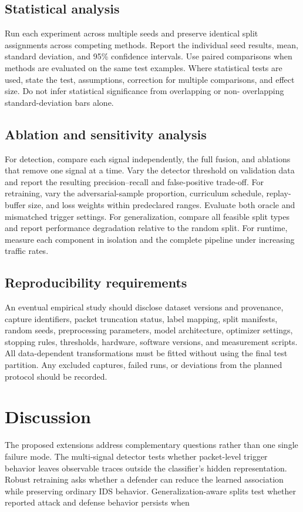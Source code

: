 \documentclass[11pt]{article}
\begin{document}
\subsection{Statistical analysis}
Run each experiment across multiple seeds and preserve identical split assignments across competing methods. Report the individual seed results, mean, standard deviation, and 95\% confidence intervals. Use paired comparisons when methods are evaluated on the same test examples. Where statistical tests are used, state the test, assumptions, correction for multiple comparisons, and effect size. Do not infer statistical significance from overlapping or non- overlapping standard-deviation bars alone.

\subsection{Ablation and sensitivity analysis}
For detection, compare each signal independently, the full fusion, and ablations that remove one signal at a time. Vary the detector threshold on validation data and report the resulting precision--recall and false-positive trade-off. For retraining, vary the adversarial-sample proportion, curriculum schedule, replay-buffer size, and loss weights within predeclared ranges. Evaluate both oracle and mismatched trigger settings. For generalization, compare all feasible split types and report performance degradation relative to the random split. For runtime, measure each component in isolation and the complete pipeline under increasing traffic rates.

\subsection{Reproducibility requirements}
An eventual empirical study should disclose dataset versions and provenance, capture identifiers, packet truncation status, label mapping, split manifests, random seeds, preprocessing parameters, model architecture, optimizer settings, stopping rules, thresholds, hardware, software versions, and measurement scripts. All data-dependent transformations must be fitted without using the final test partition. Any excluded captures, failed runs, or deviations from the planned protocol should be recorded.

\section{Discussion}
The proposed extensions address complementary questions rather than one single failure mode. The multi-signal detector tests whether packet-level trigger behavior leaves observable traces outside the classifier's hidden representation. Robust retraining asks whether a defender can reduce the learned association while preserving ordinary IDS behavior. Generalization-aware splits test whether reported attack and defense behavior persists when
\end{document}
